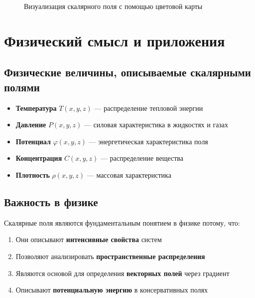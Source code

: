 \documentclass[12pt]{article}
\begin{document}
	\begin{figure}[H]
		\centering
		\caption{Визуализация скалярного поля с помощью цветовой карты}
	\end{figure}
	
	\section{Физический смысл и приложения}
	
	\subsection{Физические величины, описываемые скалярными полями}
	
	\begin{itemize}
		\item \textbf{Температура} $T(x,y,z)$ — распределение тепловой энергии
		\item \textbf{Давление} $P(x,y,z)$ — силовая характеристика в жидкостях и газах
		\item \textbf{Потенциал} $\varphi(x,y,z)$ — энергетическая характеристика поля
		\item \textbf{Концентрация} $C(x,y,z)$ — распределение вещества
		\item \textbf{Плотность} $\rho(x,y,z)$ — массовая характеристика
	\end{itemize}
	
	\subsection{Важность в физике}
	
	Скалярные поля являются фундаментальным понятием в физике потому, что:
	
	\begin{enumerate}
		\item Они описывают \textbf{интенсивные свойства} систем
		\item Позволяют анализировать \textbf{пространственные распределения}
		\item Являются основой для определения \textbf{векторных полей} через градиент
		\item Описывают \textbf{потенциальную энергию} в консервативных полях
	\end{enumerate}
	
\end{document}
